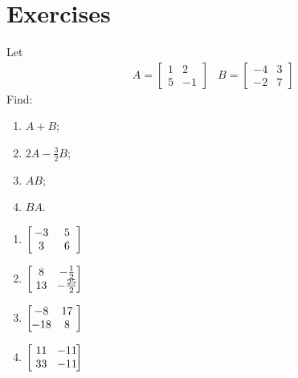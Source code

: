 \section{Exercises}
\begin{Exercise}
Let 
\begin{align*}
& A =
\begin{bmatrix}
1 & 2 \\
5 & -1 
\end{bmatrix}
& B =
\begin{bmatrix}
-4 & 3 \\
-2 & 7 
\end{bmatrix}
\end{align*}
Find:
\begin{enumerate}[label=(\alph*)]
\item $A+B$;
\item $2A-\frac{3}{2}B$;
\item $AB$;
\item $BA$.
\end{enumerate}
\end{Exercise}
\begin{Answer}
\begin{enumerate}[label=(\alph*)]
\item $\left[\begin{array}{@{\,}wc{13pt}wc{13pt}@{\,}}
-3 & 5 \\
3 & 6 \\
\end{array}\right]$
\item $\left[\begin{array}{@{\,}wc{13pt}wc{13pt}@{\,}}
8 & -\frac{1}{2} \\
13 & -\frac{25}{2} \\
\end{array}\right]$
\item $\left[\begin{array}{@{\,}wc{13pt}wc{13pt}@{\,}}
-8 & 17 \\
-18 & 8 \\
\end{array}\right]$
\item $\left[\begin{array}{@{\,}wc{13pt}wc{13pt}@{\,}}
11 & -11 \\
33 & -11 \\
\end{array}\right]$
\end{enumerate}   
\end{Answer}

